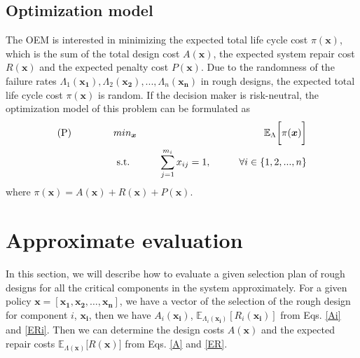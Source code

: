 \documentclass[preprint,12pt]{elsarticle}
\begin{document}
\subsection{Optimization model}
The OEM is interested in minimizing the expected total life cycle cost $\pi(\boldsymbol{x})$, which is the sum of the total design cost $A(\boldsymbol{x})$, the expected system repair cost $R(\boldsymbol{x})$ and the expected penalty cost $P(\boldsymbol{x})$. Due to the randomness of the failure rates $\Lambda_{1}(\boldsymbol{x_{1}}),\Lambda_{2}(\boldsymbol{x_{2}}),...,\Lambda_{n}(\boldsymbol{x_{n}})$ in rough designs, the expected total life cycle cost $\pi(\boldsymbol{x})$ is random. If the decision maker is risk-neutral, the optimization model of this problem can be formulated as
\begin{eqnarray}
\text{(P)} \hspace{15mm} & min_{\boldsymbol{x}} & \hspace{10mm} \mathbb{E}_{\Lambda} \bigg[ \pi(\boldsymbol{x})\bigg] \nonumber\\
& \text{ s.t. }&  \hspace{5mm} \sum_{j=1}^{m_i}{x_{ij}}=1, \hspace{10mm} \forall i \in \{1,2,...,n\} \nonumber
\end{eqnarray}
where $\pi(\boldsymbol{x})=A(\boldsymbol{x})+R(\boldsymbol{x})+P(\boldsymbol{x})$.

%


\section{Approximate evaluation}

In this section, we will describe how to evaluate a given selection plan of rough designs for all the critical components in the system approximately. For a given policy $\boldsymbol{x}=[\boldsymbol{x_{1}},\boldsymbol{x_{2}},\dots,\boldsymbol{x_{n}}]$, we have a vector of the selection of the rough design for component $i$, $\boldsymbol{x_{i}}$, then we have $A_{i}(\boldsymbol{x_{i}})$, $\mathbb{E}_{\Lambda_{i}(\boldsymbol{x_{i}})}[R_{i}(\boldsymbol{x_{i}})]$ from Eqs. \eqref{Ai} and \eqref{ERi}. Then we can determine the design costs $A(\boldsymbol{x})$ and the expected repair costs $\mathbb{E}_{\Lambda(\boldsymbol{x})} \big[ R(\boldsymbol{x}) \big]$ from Eqs. \eqref{A} and \eqref{ER}.
\end{document}
